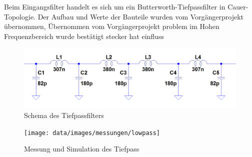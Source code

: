 Beim Eingangsfilter handelt es sich um ein Butterworth-Tiefpassfilter in Cauer-Topologie. Der Aufbau und Werte der Bauteile wurden vom Vorgängerprojekt übernommen, 
Übernommen vom Vorgängerprojekt
problem im Hohen Frequenzbereich wurde bestätigt
stecker hat einfluss

\begin{figure}[H]
	\begin{center}
		\includegraphics[clip,scale=0.4]{data/images/lowpass}
		\caption{Schema des Tiefpassfilters}
		\label{fig:lowpass}
	\end{center}
\end{figure}

\begin{figure}[H]
	\begin{center}
		\texttt{[image: data/images/messungen/lowpass]}
		\caption{Messung und Simulation des Tiefpass}
		\label{fig:lowpass-plot}
	\end{center}
\end{figure}


